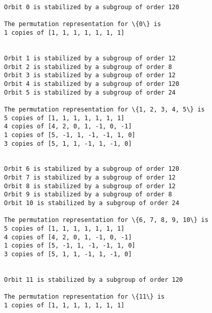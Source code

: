 \documentclass[11pt]{article}
\begin{document}
    \begin{Verbatim}[commandchars=\\\{\}]
Orbit 0 is stabilized by a subgroup of order 120

The permutation representation for \{0\} is
1 copies of [1, 1, 1, 1, 1, 1, 1]


Orbit 1 is stabilized by a subgroup of order 12
Orbit 2 is stabilized by a subgroup of order 8
Orbit 3 is stabilized by a subgroup of order 12
Orbit 4 is stabilized by a subgroup of order 120
Orbit 5 is stabilized by a subgroup of order 24

The permutation representation for \{1, 2, 3, 4, 5\} is
5 copies of [1, 1, 1, 1, 1, 1, 1]
4 copies of [4, 2, 0, 1, -1, 0, -1]
1 copies of [5, -1, 1, -1, -1, 1, 0]
3 copies of [5, 1, 1, -1, 1, -1, 0]


Orbit 6 is stabilized by a subgroup of order 120
Orbit 7 is stabilized by a subgroup of order 12
Orbit 8 is stabilized by a subgroup of order 12
Orbit 9 is stabilized by a subgroup of order 8
Orbit 10 is stabilized by a subgroup of order 24

The permutation representation for \{6, 7, 8, 9, 10\} is
5 copies of [1, 1, 1, 1, 1, 1, 1]
4 copies of [4, 2, 0, 1, -1, 0, -1]
1 copies of [5, -1, 1, -1, -1, 1, 0]
3 copies of [5, 1, 1, -1, 1, -1, 0]


Orbit 11 is stabilized by a subgroup of order 120

The permutation representation for \{11\} is
1 copies of [1, 1, 1, 1, 1, 1, 1]


    \end{Verbatim}


    
    
    
\end{document}
